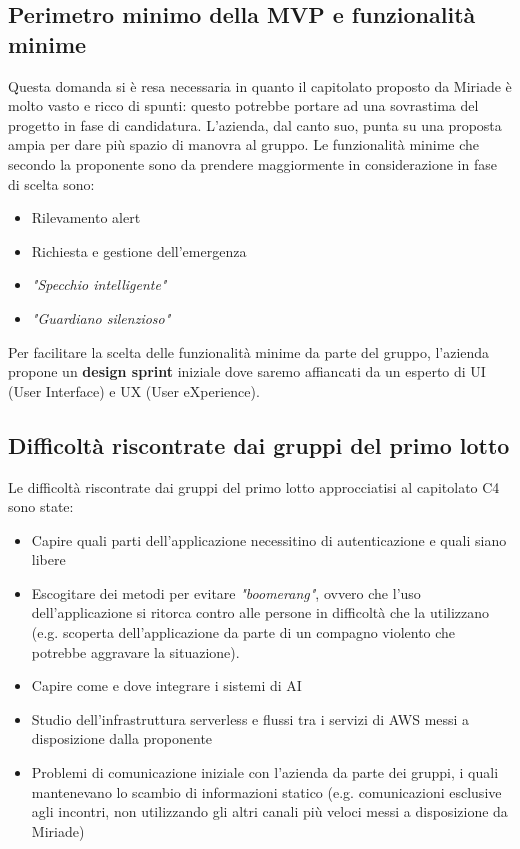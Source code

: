 \documentclass[a4paper, 10pt, colorlinks=true, linkcolor=black, urlcolor=blue, citecolor=blue, hidelinks]{article}
\begin{document}
\subsection{Perimetro minimo della MVP e funzionalità minime}
Questa domanda si è resa necessaria in quanto il capitolato proposto da Miriade è molto vasto e ricco di spunti: questo potrebbe portare ad una sovrastima del progetto in fase di candidatura. L'azienda, dal canto suo, punta su una proposta ampia per dare più spazio di manovra al gruppo. Le funzionalità minime che secondo la proponente sono da prendere maggiormente in considerazione in fase di scelta sono:
\begin{itemize}
    \item Rilevamento alert
    \item Richiesta e gestione dell'emergenza
    \item \textit{"Specchio intelligente"}
    \item \textit{"Guardiano silenzioso"}
\end{itemize}
Per facilitare la scelta delle funzionalità minime da parte del gruppo, l'azienda propone un \textbf{design sprint} iniziale dove saremo affiancati da un esperto di UI (User Interface) e UX (User eXperience).

\subsection{Difficoltà riscontrate dai gruppi del primo lotto}
Le difficoltà riscontrate dai gruppi del primo lotto approcciatisi al capitolato C4 sono state:
\begin{itemize}
    \item Capire quali parti dell'applicazione necessitino di autenticazione e quali siano libere
    \item Escogitare dei metodi per evitare \textit{"boomerang"}, ovvero che l'uso dell'applicazione si ritorca contro alle persone in difficoltà che la utilizzano (e.g. scoperta dell'applicazione da parte di un compagno violento che potrebbe aggravare la situazione).
    \item Capire come e dove integrare i sistemi di AI
    \item Studio dell'infrastruttura serverless e flussi tra i servizi di AWS messi a disposizione dalla proponente
    \item Problemi di comunicazione iniziale con l'azienda da parte dei gruppi, i quali mantenevano lo scambio di informazioni statico (e.g. comunicazioni esclusive agli incontri, non utilizzando gli altri canali più veloci messi a disposizione da Miriade)
\end{itemize}
\end{document}
